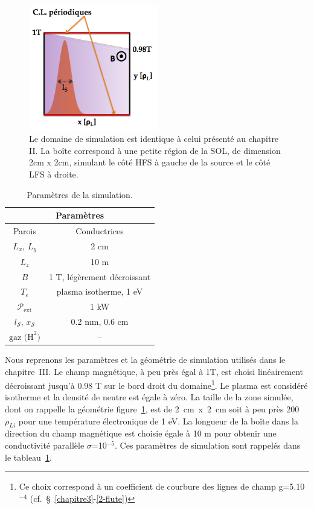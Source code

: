 \begin{refsection}
\begin{figure}[!htbp]
\centering
\includegraphics[width=0.5\textwidth]{figures/4-tokamSimDomain.png}
\caption{Le domaine de simulation est identique à celui présenté au
chapitre II. La boîte correspond à une petite région de la SOL, de dimension
2cm x 2cm, simulant le côté HFS à gauche de la source et le côté LFS à droite.
\label{4-tokamSimDomain}}
\end{figure}

\begin{table}[!htbp]
\footnotesize\centering
{}
\begin{tabular}{cc}\toprule
\multicolumn{2}{c}{\bf Paramètres}\\
\midrule 
Parois & Conductrices\\
$L_x$, $L_y$ & 2 cm\\
$L_z$ & 10 m\\
$B$&1 T, légèrement décroissant\\
$T_e$& plasma isotherme, 1 eV\\
$\mathcal{P}_\text{ext}$&1 kW\\
$l_\mathcal{S}$, $x_\mathcal{S}$& 0.2 mm, 0.6 cm\\
$\text{gaz (H}^2\text{)}$ & -- \\
\bottomrule
\end{tabular}
\caption{Paramètres de la simulation.}\label{4-CybeleParam3}
\end{table}

Nous reprenons les paramètres et la géométrie de simulation utilisés dans le
chapitre~III. Le champ magnétique, à peu près égal à 1T, est
choisi linéairement décroissant jusqu'à 0.98 T sur le bord droit du
domaine\footnote{Ce choix correspond à un coefficient de courbure des lignes de
champ g=5.10$^{-4}$ (cf.~\S~\ref{chapitre3}-\ref{2-flute})}.
Le plasma est considéré isotherme et la densité de neutre est égale à zéro. La
taille de la zone simulée, dont on rappelle la géométrie
figure~\ref{4-tokamSimDomain}, est de 2~cm~x~2~cm soit à peu près 200
$\rho_{Li}$ pour une température électronique de 1 eV. La longueur de la
boîte dans la direction du champ magnétique est choisie égale à 10 m pour obtenir une
conductivité parallèle $\sigma$=10$^{-5}$. Ces paramètres de simulation sont
rappelés dans le tableau~\ref{4-CybeleParam3}.


\end{refsection}
